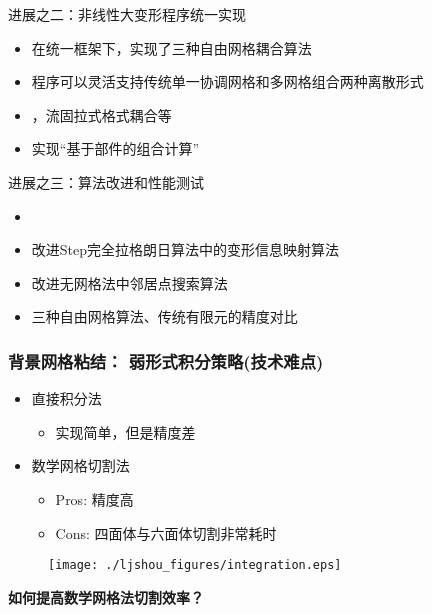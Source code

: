 \documentclass[mathserif]{beamer}
\begin{document}
\begin{CJK}{UTF8}{gkai}
\begin{frame}
\begin{columns}
\begin{column}[pos]{0.6\textwidth}
    			\end{column}
		\end{columns}
	\end{frame}	


        \begin{frame}{进展之二：非线性大变形程序统一实现}
            \begin{itemize}
            \item 在统一框架下，实现了三种自由网格耦合算法
            \item 程序可以灵活支持传统单一协调网格和多网格组合两种离散形式
            \item {，流固拉式格式耦合等}
            \item {\color{red}实现“基于部件的组合计算”}
            \end{itemize}
        \end{frame}
        
        \begin{frame}{进展之三：算法改进和性能测试}
            \begin{itemize}
            \item {}
            \item 改进Step完全拉格朗日算法中的变形信息映射算法
            \item 改进无网格法中邻居点搜索算法
            \item 三种自由网格算法、传统有限元的精度对比
            \end{itemize}
        \end{frame}
 
 
        
\begin{frame}
\frametitle{背景网格粘结： 弱形式积分策略(技术难点)}
\begin{itemize}
	\item 直接积分法
	    \begin{itemize}
	        \item 实现简单，但是精度差
	    \end{itemize}
	\item 数学网格切割法
    				\begin{itemize}
    					\item Pros: 精度高
                        \item Cons: 四面体与六面体切割非常耗时
    				\end{itemize}
\end{itemize}
\begin{figure}
		\centering
		\texttt{[image: ./ljshou\_figures/integration.eps]}
\end{figure}
\begin{block}{}
	\bf \color{red} 如何提高数学网格法切割效率？
\end{block}
\end{frame}


\end{CJK}
\end{document}
